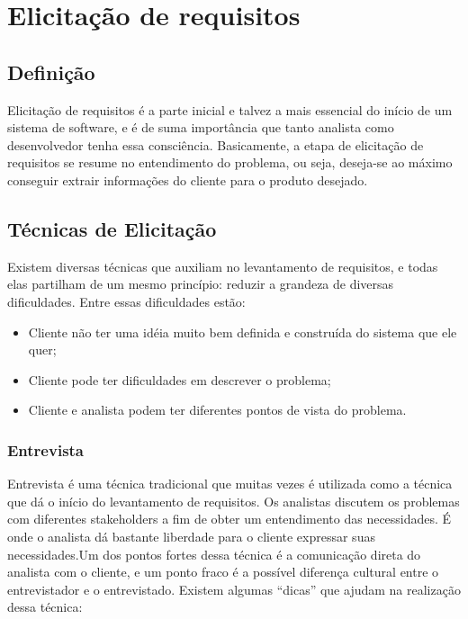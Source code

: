 \chapter{Elicitação de requisitos}

\section{Definição}

  Elicitação de requisitos é a parte inicial e talvez a mais essencial do início de um sistema de software, e é de suma importância que
  tanto analista como desenvolvedor tenha essa consciência. Basicamente, a etapa de elicitação de requisitos se resume no entendimento
  do problema, ou seja, deseja-se ao máximo conseguir extrair informações do cliente para o produto desejado.

\section{Técnicas de Elicitação}

  Existem diversas técnicas que auxiliam no levantamento de requisitos, e todas elas partilham de um mesmo princípio: reduzir a grandeza de diversas dificuldades. Entre essas dificuldades estão:

  \begin{itemize}
    \item Cliente não ter uma idéia muito bem definida e construída do sistema que ele quer;
    \item Cliente pode ter dificuldades em descrever o problema;
    \item Cliente e analista podem ter diferentes pontos de vista do problema.
  \end{itemize}

\subsection{Entrevista}

  Entrevista é uma técnica tradicional que muitas vezes é utilizada como a técnica que dá o início do levantamento de requisitos.
  Os analistas discutem os problemas com diferentes stakeholders a fim de obter um entendimento das necessidades. É onde o analista
  dá bastante liberdade para o cliente expressar suas necessidades.Um dos pontos fortes dessa técnica é a comunicação direta do
  analista com o cliente, e um ponto fraco é a possível diferença cultural entre o entrevistador e o entrevistado. Existem algumas
  “dicas” que ajudam na realização dessa técnica:

